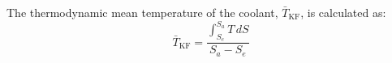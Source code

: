 The thermodynamic mean temperature of the coolant, \( \bar{T}_{\text{KF}} \), is calculated as:  
\[
\bar{T}_{\text{KF}} = \frac{\int_{S_e}^{S_a} T \, dS}{S_a - S_e}
\]